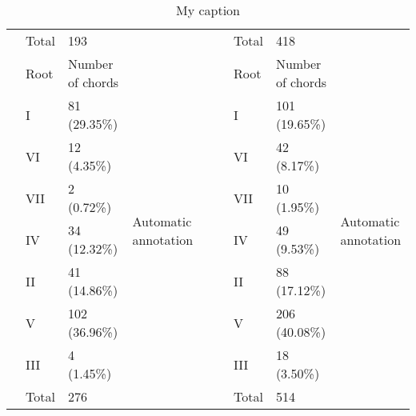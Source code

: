 \begin{table}[]
{\begin{tabular}{|l|l|l|l|l|l|l|l|l|}
 & Total & 193 &  &  &  & Total & 418 &  \\ \cline{2-4} \cline{7-9}
 & Root & Number of chords & \multirow{9}{*}{Automatic annotation} &  &  & Root & Number of chords & \multirow{9}{*}{Automatic annotation} \\ \cline{2-3} \cline{7-8}
 & I & 81 (29.35\%) &  &  &  & I & 101 (19.65\%) &  \\ \cline{2-3} \cline{7-8}
 & VI & 12 (4.35\%) &  &  &  & VI & 42 (8.17\%) &  \\ \cline{2-3} \cline{7-8}
 & VII & 2 (0.72\%) &  &  &  & VII & 10 (1.95\%) &  \\ \cline{2-3} \cline{7-8}
 & IV & 34 (12.32\%) &  &  &  & IV & 49 (9.53\%) &  \\ \cline{2-3} \cline{7-8}
 & II & 41 (14.86\%) &  &  &  & II & 88 (17.12\%) &  \\ \cline{2-3} \cline{7-8}
 & V & 102 (36.96\%) &  &  &  & V & 206 (40.08\%) &  \\ \cline{2-3} \cline{7-8}
 & III & 4 (1.45\%) &  &  &  & III & 18 (3.50\%) &  \\ \cline{2-3} \cline{7-8}
 & Total & 276 &  &  &  & Total & 514 &  \\ \cline{1-4} \cline{6-9}
\end{tabular}
}
\caption{My caption}
\label{my-label}
\end{table}

\newpage
